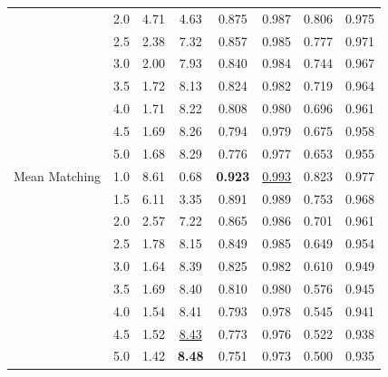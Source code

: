 \begin{table}[htbp]
\begin{tabular}{l|l|cccccc|}
 & 2.0 & 4.71 & 4.63 & 0.875 & 0.987 & 0.806 & 0.975 \\
 & 2.5 & 2.38 & 7.32 & 0.857 & 0.985 & 0.777 & 0.971 \\
 & 3.0 & 2.00 & 7.93 & 0.840 & 0.984 & 0.744 & 0.967 \\
 & 3.5 & 1.72 & 8.13 & 0.824 & 0.982 & 0.719 & 0.964 \\
 & 4.0 & 1.71 & 8.22 & 0.808 & 0.980 & 0.696 & 0.961 \\
 & 4.5 & 1.69 & 8.26 & 0.794 & 0.979 & 0.675 & 0.958 \\
 & 5.0 & 1.68 & 8.29 & 0.776 & 0.977 & 0.653 & 0.955 \\
\hline
Mean Matching & 1.0 & 8.61 & 0.68 & \textbf{0.923} & \underline{0.993} & 0.823 & 0.977 \\
 & 1.5 & 6.11 & 3.35 & 0.891 & 0.989 & 0.753 & 0.968 \\
 & 2.0 & 2.57 & 7.22 & 0.865 & 0.986 & 0.701 & 0.961 \\
 & 2.5 & 1.78 & 8.15 & 0.849 & 0.985 & 0.649 & 0.954 \\
 & 3.0 & 1.64 & 8.39 & 0.825 & 0.982 & 0.610 & 0.949 \\
 & 3.5 & 1.69 & 8.40 & 0.810 & 0.980 & 0.576 & 0.945 \\
 & 4.0 & 1.54 & 8.41 & 0.793 & 0.978 & 0.545 & 0.941 \\
 & 4.5 & 1.52 & \underline{8.43} & 0.773 & 0.976 & 0.522 & 0.938 \\
 & 5.0 & 1.42 & \textbf{8.48} & 0.751 & 0.973 & 0.500 & 0.935 \\
\hline
\end{tabular}
\end{table}

